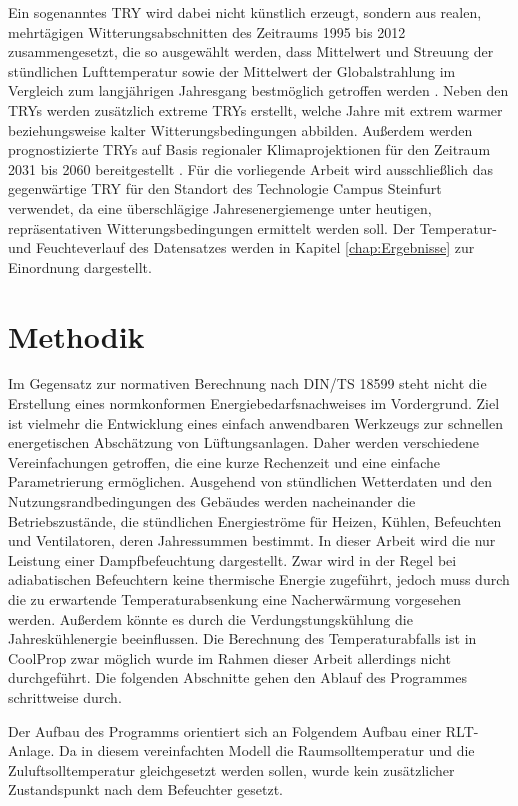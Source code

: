 \documentclass{scrreprt}
\begin{document}
Ein sogenanntes \ac{TRY} wird dabei nicht künstlich erzeugt, sondern
aus realen, mehrtägigen Witterungsabschnitten des Zeitraums 1995 bis
2012 zusammengesetzt, die so ausgewählt werden, dass Mittelwert und
Streuung der stündlichen Lufttemperatur sowie der Mittelwert der
Globalstrahlung im Vergleich zum langjährigen Jahresgang
bestmöglich getroffen werden \parencite{DWDBBR2017}. Neben den \acp{TRY} werden zusätzlich extreme \acp{TRY} erstellt, welche Jahre mit extrem warmer beziehungsweise kalter Witterungsbedingungen abbilden. Außerdem werden prognostizierte \acp{TRY} auf Basis regionaler
Klimaprojektionen für den Zeitraum 2031 bis 2060 bereitgestellt
\parencite{DWDBBR2017}. Für die vorliegende Arbeit wird ausschließlich
das gegenwärtige \ac{TRY} für den Standort des Technologie Campus Steinfurt verwendet, da eine überschlägige
Jahresenergiemenge unter heutigen, repräsentativen
Witterungsbedingungen ermittelt werden soll. Der Temperatur-und Feuchteverlauf des Datensatzes werden in Kapitel \ref{chap:Ergebnisse} zur Einordnung dargestellt.

\chapter{Methodik}\label{chap:Methodik}

Im Gegensatz zur normativen Berechnung nach DIN/TS 18599 steht nicht die Erstellung eines normkonformen Energiebedarfsnachweises im Vordergrund. Ziel ist vielmehr die Entwicklung eines einfach anwendbaren Werkzeugs zur schnellen energetischen Abschätzung von Lüftungsanlagen. Daher werden verschiedene Vereinfachungen getroffen, die eine kurze Rechenzeit und eine einfache Parametrierung ermöglichen. Ausgehend von stündlichen
Wetterdaten und den Nutzungsrandbedingungen des Gebäudes werden
nacheinander die Betriebszustände, die stündlichen Energieströme für
Heizen, Kühlen, Befeuchten und Ventilatoren, deren Jahressummen bestimmt. In dieser Arbeit wird die nur Leistung einer Dampfbefeuchtung dargestellt. Zwar wird in der Regel bei adiabatischen Befeuchtern keine thermische Energie zugeführt, jedoch muss durch die zu erwartende Temperaturabsenkung eine Nacherwärmung vorgesehen werden. Außerdem könnte es durch die Verdungstungskühlung die Jahreskühlenergie beeinflussen. Die Berechnung des Temperaturabfalls ist in CoolProp zwar möglich wurde im Rahmen dieser Arbeit allerdings nicht durchgeführt. Die folgenden Abschnitte gehen den Ablauf des Programmes schrittweise durch.

Der Aufbau des Programms orientiert sich an Folgendem Aufbau einer RLT-Anlage. Da in diesem vereinfachten Modell die Raumsolltemperatur und die Zuluftsolltemperatur gleichgesetzt werden sollen, wurde kein zusätzlicher Zustandspunkt nach dem Befeuchter gesetzt.
\end{document}
